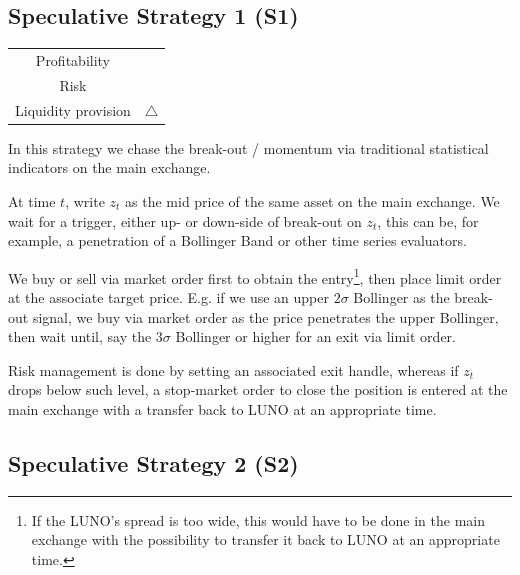 \documentclass[12pt,a4paper]{article}
\begin{document}
\vfill

\pagebreak

\subsection{Speculative Strategy 1 (S1)}

\begin{table}[h]
	\centering
	\begin{tabular}{c|c}
		
		Profitability& \textdollaroldstyle \textdollaroldstyle \textdollaroldstyle \\
		
		Risk & \Radioactivity  \Radioactivity \Radioactivity \\
		
		Liquidity provision &$ \bigtriangleup$\\
		
	\end{tabular}
\end{table}

In this strategy we chase the break-out / momentum via traditional statistical indicators on the main exchange.

At time $t$, write $z_t$ as the mid price of the same asset on the main exchange. We wait for a trigger, either up- or down-side of break-out on $z_t$, this can be, for example, a penetration of a Bollinger Band or other time series evaluators.

We buy or sell via market order first to obtain the entry\footnote{If the LUNO's spread is too wide, this would have to be done in the main exchange with the possibility to transfer it back to LUNO at an appropriate time.}, then place limit order at the associate target price. E.g. if we use an upper $2\sigma$ Bollinger as the break-out signal, we buy via market order as the price penetrates the upper Bollinger, then wait until, say the  $3\sigma$ Bollinger or higher for an exit via limit order.

Risk management is done by setting an associated exit handle, whereas if $z_t$ drops below such level, a stop-market order to close the position is entered at the main exchange with a transfer back to LUNO at an appropriate time.
\subsection{Speculative Strategy 2 (S2)}
\end{document}
